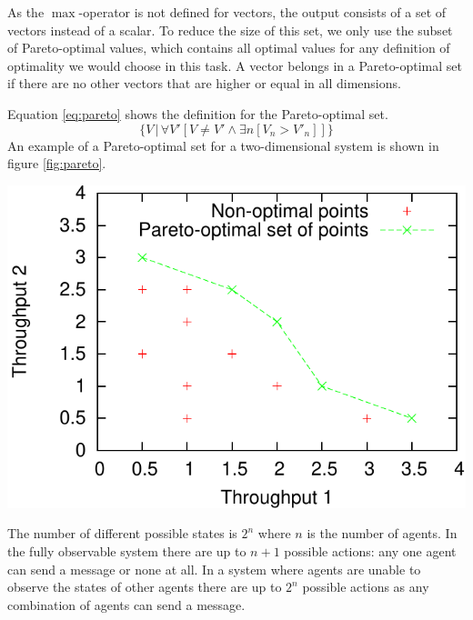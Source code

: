 \documentclass{article}
\makeatletter
\newenvironment{figurehere}
{\def\@captype{figure}}
{}
\makeatother
\begin{document}
\begin{multicols}{2}
		As the $\max$-operator is not defined for vectors, the output consists of
		a set of vectors instead of a scalar. To reduce the size of this set, we
		only use the subset of Pareto-optimal values, which contains all optimal
		values for any definition of optimality we would choose in this task.
		A vector belongs in a Pareto-optimal set if there are no other vectors
		that are higher or equal in all dimensions.

		Equation \ref{eq:pareto} shows the definition for the Pareto-optimal set.
		\begin{equation}
			\label{eq:pareto}
			\Big\{ V\, \Big| \, \forall V'[ V \neq V' \land \exists n [V_n > V'_n]] \Big\}
		\end{equation}
		An example of a Pareto-optimal set for a two-dimensional system is shown in
		figure \ref{fig:pareto}.

		\vspace{0.5cm}
		\begin{figurehere}
			\centering
			\includegraphics[width=\columnwidth]{images/pareto}
			\label{fig:pareto}
		\end{figurehere}
		\vspace{0.5cm}

		The number of different possible states is $2^n$ where $n$ is the number
		of agents. In the fully observable system there are up to $n+1$ possible
		actions: any one agent can send a message or none at all. In a system
		where agents are unable to observe the states of other agents there are
		up to $2^n$ possible actions as any combination of agents can send a
		message.


\end{multicols}
\end{document}
